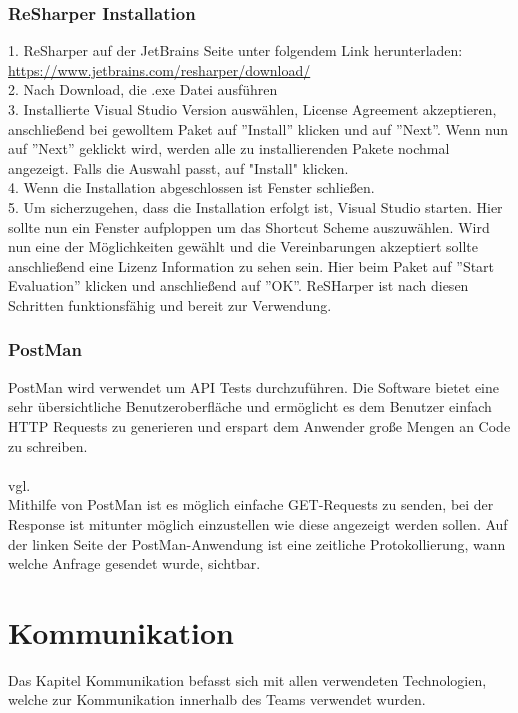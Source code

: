 \subsubsection{ReSharper Installation}
\label{sec:ReSharperInstallation}
1. ReSharper auf der JetBrains Seite unter folgendem Link herunterladen: \break \url {https://www.jetbrains.com/resharper/download/} \\
2. Nach Download, die .exe Datei ausführen \\
3. Installierte Visual Studio Version auswählen, License Agreement akzeptieren, anschließend bei gewolltem Paket auf ''Install'' klicken und auf ''Next''. 
Wenn nun auf ''Next'' geklickt wird, werden alle zu installierenden Pakete nochmal angezeigt. Falls die Auswahl passt, auf "Install" klicken. \\
4. Wenn die Installation abgeschlossen ist Fenster schließen. \\
5. Um sicherzugehen, dass die Installation erfolgt ist, Visual Studio starten. Hier sollte nun ein Fenster aufploppen um das Shortcut Scheme auszuwählen.
Wird nun eine der Möglichkeiten gewählt und die Vereinbarungen akzeptiert sollte anschließend eine Lizenz Information zu sehen sein. Hier beim Paket auf ''Start Evaluation'' klicken und anschließend auf ''OK''. ReSHarper ist nach diesen Schritten funktionsfähig und bereit zur Verwendung.
\subsubsection {PostMan}
\label{sec:PostMan}
PostMan wird verwendet um API Tests durchzuführen. Die Software bietet eine sehr übersichtliche Benutzeroberfläche und ermöglicht es dem Benutzer einfach HTTP Requests zu generieren und erspart dem Anwender große Mengen an Code zu schreiben. \\
\\vgl. \cite{TechnologiePostman} \\ \break
Mithilfe von PostMan ist es möglich einfache GET-Requests zu senden, bei der Response ist mitunter möglich einzustellen wie diese angezeigt werden sollen. Auf der linken Seite der PostMan-Anwendung ist eine zeitliche Protokollierung, wann welche Anfrage gesendet wurde, sichtbar.
\section{Kommunikation}
\label{sec:Kommunikation}
Das Kapitel Kommunikation befasst sich mit allen verwendeten Technologien, welche zur Kommunikation innerhalb des Teams verwendet wurden.

